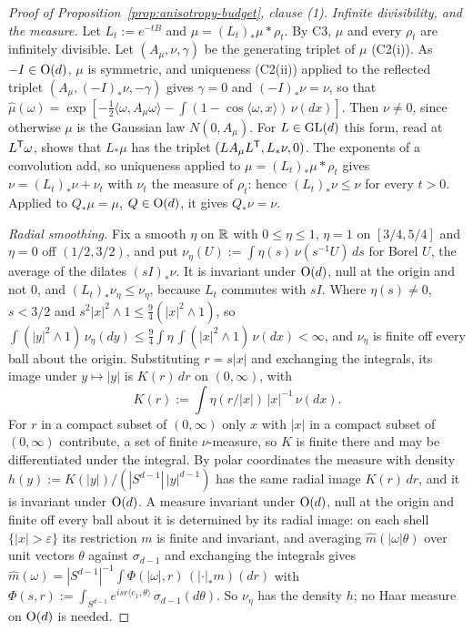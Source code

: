 \begin{proof}[Proof of Proposition~\ref{prop:anisotropy-budget}, clause (1)]
\emph{Infinite divisibility, and the \Levy{} measure.} Let $L_t := e^{-tB}$ and
$\mu = (L_t)_*\mu * \rho_t$. By C3, $\mu$ and every $\rho_t$ are infinitely divisible.
Let $(A_\mu, \nu, \gamma)$ be the generating triplet of $\mu$ (C2(i)). As $-I \in \mathrm{O}(d)$,
$\mu$ is symmetric, and uniqueness (C2(ii)) applied to the reflected triplet
$(A_\mu, (-I)_*\nu, -\gamma)$ gives $\gamma = 0$ and $(-I)_*\nu = \nu$, so that
$\widehat\mu(\omega) = \exp[-\frac12\langle \omega,A_\mu \omega\rangle - \int(1 - \cos\langle \omega,x\rangle)\,\nu(dx)]$.
Then $\nu \ne 0$, since otherwise $\mu$ is the Gaussian law $N(0, A_\mu)$. For $L \in \mathrm{GL}(d)$ this form,
read at $L^{\mathsf{T}}\omega$, shows that $L_*\mu$ has the triplet $(LA_\mu L^{\mathsf{T}}, L_*\nu, 0)$. The exponents of
a convolution add, so uniqueness applied to $\mu = (L_t)_*\mu * \rho_t$ gives $\nu = (L_t)_*\nu + \nu_t$
with $\nu_t$ the \Levy{} measure of $\rho_t$: hence $(L_t)_*\nu \le \nu$ for every $t > 0$. Applied to
$Q_*\mu = \mu$, $Q \in \mathrm{O}(d)$, it gives $Q_*\nu = \nu$.

\emph{Radial smoothing.} Fix a smooth $\eta$ on $\mathbb{R}$ with $0 \le \eta \le 1$, $\eta = 1$ on
$[3/4, 5/4]$ and $\eta = 0$ off $(1/2, 3/2)$, and put $\nu_\eta(U) := \int\eta(s)\,\nu(s^{-1}U)\,ds$ for
Borel $U$, the average of the dilates $(sI)_*\nu$. It is invariant under $\mathrm{O}(d)$, null at the
origin and not $0$, and $(L_t)_*\nu_\eta \le \nu_\eta$, because $L_t$ commutes with $sI$. Where
$\eta(s) \ne 0$, $s < 3/2$ and $s^2|x|^2 \wedge 1 \le \frac94(|x|^2 \wedge 1)$, so
$\int(|y|^2 \wedge 1)\,\nu_\eta(dy) \le \frac94\int\eta\,\int(|x|^2 \wedge 1)\,\nu(dx) < \infty$, and
$\nu_\eta$ is finite off every ball about the origin. Substituting $r = s|x|$ and exchanging the
integrals, its image under $y \mapsto |y|$ is $K(r)\,dr$ on $(0,\infty)$, with
\[
  K(r) := \int\eta(r/|x|)\,|x|^{-1}\,\nu(dx) .
\]
For $r$ in a compact subset of $(0,\infty)$ only $x$ with $|x|$ in a compact subset of $(0,\infty)$
contribute, a set of finite $\nu$-measure, so $K$ is finite there and may be differentiated under the
integral. By polar coordinates the measure with density $h(y) := K(|y|)/(|S^{d-1}|\,|y|^{d-1})$ has the
same radial image $K(r)\,dr$, and it is invariant under $\mathrm{O}(d)$. A measure invariant under
$\mathrm{O}(d)$, null at the origin and finite off every ball about it is determined by its radial image:
on each shell $\{|x| > \varepsilon\}$ its restriction $m$ is finite and invariant, and averaging
$\widehat m(|\omega|\theta)$ over unit vectors $\theta$ against $\sigma_{d-1}$ and exchanging the integrals
gives $\widehat m(\omega) = |S^{d-1}|^{-1}\int\Phi(|\omega|,r)\,(|\cdot|_*m)(dr)$ with
$\Phi(s,r) := \int_{S^{d-1}}e^{isr\langle e_1,\theta\rangle}\,\sigma_{d-1}(d\theta)$. So $\nu_\eta$ has the
density $h$; no Haar measure on $\mathrm{O}(d)$ is needed.


\end{proof}
